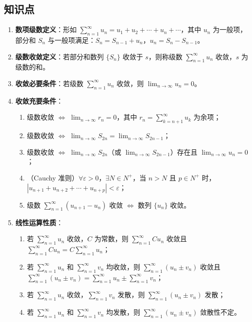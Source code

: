 \documentclass[UTF8]{ctexart}
\theoremstyle{remark}
\begin{document}
\subsection*{知识点}
\begin{enumerate}
	\item \textbf{数项级数定义}：形如 \(\sum_{n=1}^{\infty} u_{n} = u_1 + u_2 + \cdots + u_n + \cdots\)，其中 \(u_n\) 为一般项，部分和 \(S_n\) 与一般项满足：\(S_n = S_{n-1} + u_n\)，\(u_n = S_n - S_{n-1}\)。
	
	\item \textbf{级数收敛定义}：若部分和数列 \(\{S_n\}\) 收敛于 \(s\)，则称级数 \(\sum_{n=1}^{\infty} u_n\) 收敛，\(s\) 为级数的和。
	
	\item \textbf{收敛必要条件}：若级数 \(\sum_{n=1}^{\infty} u_n\) 收敛，则 \(\lim_{n \to \infty} u_n = 0\)。
	
	\item \textbf{收敛充要条件}：
	\begin{enumerate}
		\item 级数收敛 \(\Leftrightarrow\) \(\lim_{n \to \infty} r_n = 0\)，其中 \(r_n = \sum_{k=n+1}^{\infty} u_k\) 为余项；
		\item 级数收敛 \(\Leftrightarrow\) \(\lim_{n \to \infty} S_{2n} = \lim_{n \to \infty} S_{2n-1}\)；
		\item 级数收敛 \(\Leftrightarrow\) \(\lim_{n \to \infty} S_{2n}\)（或 \(\lim_{n \to \infty} S_{2n-1}\)）存在且 \(\lim_{n \to \infty} u_n = 0\)；
		\item （Cauchy 准则）\(\forall \varepsilon > 0\)，\(\exists N \in N^+\)，当 \(n > N\) 且 \(p \in N^+\) 时，\(|u_{n+1} + u_{n+2} + \cdots + u_{n+p}| < \varepsilon\)；
		\item 级数 \(\sum_{n=1}^{\infty} (u_{n+1} - u_n)\) 收敛 \(\Leftrightarrow\) 数列 \(\{u_n\}\) 收敛。
	\end{enumerate}
	
	\item \textbf{线性运算性质}：
	\begin{enumerate}
		\item 若 \(\sum_{n=1}^{\infty} u_n\) 收敛，\(C\) 为常数，则 \(\sum_{n=1}^{\infty} C u_n\) 收敛且 \(\sum_{n=1}^{\infty} C u_n = C \sum_{n=1}^{\infty} u_n\)；
		\item 若 \(\sum_{n=1}^{\infty} u_n\) 和 \(\sum_{n=1}^{\infty} v_n\) 均收敛，则 \(\sum_{n=1}^{\infty} (u_n \pm v_n)\) 收敛且 \(\sum_{n=1}^{\infty} (u_n \pm v_n) = \sum_{n=1}^{\infty} u_n \pm \sum_{n=1}^{\infty} v_n\)；
		\item 若 \(\sum_{n=1}^{\infty} u_n\) 收敛，\(\sum_{n=1}^{\infty} v_n\) 发散，则 \(\sum_{n=1}^{\infty} (u_n \pm v_n)\) 发散；
		\item 若 \(\sum_{n=1}^{\infty} u_n\) 和 \(\sum_{n=1}^{\infty} v_n\) 均发散，则 \(\sum_{n=1}^{\infty} (u_n \pm v_n)\) 敛散性不定。
	\end{enumerate}
	

\end{enumerate}
\end{document}
